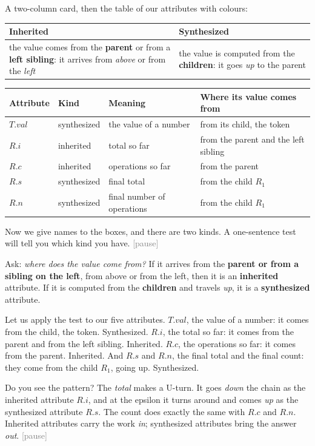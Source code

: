 \documentclass[11pt,a4paper]{article}
\newcommand{\inh}[1]{\textcolor{blue!70!black}{#1}}   %
\newcommand{\syn}[1]{\textcolor{red!70!black}{#1}}    %
\newcommand{\pause}{\textcolor{gray}{\textsf{[pause]}}}
\begin{document}
\begin{onscreen}
A two-column card, then the table of our attributes with colours:
\begin{center}
\small
\begin{tabular}{@{}p{6.4cm} p{6.4cm}@{}}
\toprule
\textcolor{blue!70!black}{\textbf{Inherited}} & \textcolor{red!70!black}{\textbf{Synthesized}} \\ \midrule
the value comes from the \textbf{parent} or from a \textbf{left sibling}: it arrives from \emph{above} or from the \emph{left} &
the value is computed from the \textbf{children}: it goes \emph{up} to the parent \\ \bottomrule
\end{tabular}
\end{center}
\begin{center}
\small
\begin{tabular}{@{}l l l p{6.0cm}@{}}
\toprule
\textbf{Attribute} & \textbf{Kind} & \textbf{Meaning} & \textbf{Where its value comes from} \\ \midrule
$T.val$ & \syn{synthesized} & the value of a number & from its child, the token \\
$R.i$ & \inh{inherited} & total so far & from the parent and the left sibling \\
$R.c$ & \inh{inherited} & operations so far & from the parent \\
$R.s$ & \syn{synthesized} & final total & from the child $R_1$ \\
$R.n$ & \syn{synthesized} & final number of operations & from the child $R_1$ \\ \bottomrule
\end{tabular}
\end{center}
\end{onscreen}

\begin{narration}
Now we give names to the boxes, and there are two kinds. A one-sentence test will tell you which kind you have. \pause

Ask: \emph{where does the value come from?} If it arrives from the \textbf{parent or from a sibling on the left}, from above or from the left, then it is an \textbf{inherited} attribute. If it is computed from the \textbf{children} and travels \emph{up}, it is a \textbf{synthesized} attribute.

Let us apply the test to our five attributes. $T.val$, the value of a number: it comes from the child, the token. Synthesized. $R.i$, the total so far: it comes from the parent and from the left sibling. Inherited. $R.c$, the operations so far: it comes from the parent. Inherited. And $R.s$ and $R.n$, the final total and the final count: they come from the child $R_1$, going up. Synthesized.

Do you see the pattern? The \emph{total} makes a U-turn. It goes \emph{down} the chain as the inherited attribute $R.i$, and at the epsilon it turns around and comes \emph{up} as the synthesized attribute $R.s$. The count does exactly the same with $R.c$ and $R.n$. Inherited attributes carry the work \emph{in}; synthesized attributes bring the answer \emph{out}. \pause
\end{narration}
\end{document}
